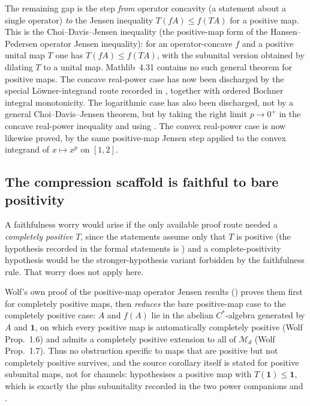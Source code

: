 \documentclass{article}
\begin{document}
The remaining gap is the step \emph{from} operator concavity (a statement about a
single operator) \emph{to} the Jensen inequality $T(fA)\le f(TA)$ for a positive
map.  This is the Choi--Davis--Jensen inequality (the positive-map form of the
Hansen--Pedersen operator Jensen inequality): for an operator-concave $f$ and a
positive unital map $T$ one has $T(fA)\le f(TA)$, with the subunital version
obtained by dilating $T$ to a unital map.  Mathlib~4.31 contains no such
general theorem for positive maps.  The concave real-power case has now been
discharged by the special Löwner-integrand route recorded in
, together
with ordered Bochner integral monotonicity.  The logarithmic case has also been
discharged, not by a general Choi--Davis--Jensen theorem, but by taking the
right limit $p\to 0^+$ in the concave real-power inequality and using
.  The convex real-power case is now
likewise proved, by the same positive-map Jensen step applied to the convex
integrand of $x\mapsto x^p$ on $[1,2]$.

\subsection{The compression scaffold is faithful to bare
positivity}\label{ssec:caveat}

A faithfulness worry would arise if the only available proof route needed a
\emph{completely positive} $T$, since the statements assume only that $T$ is
positive (the hypothesis recorded in the formal statements is
) and a complete-positivity hypothesis would be the
stronger-hypothesis variant forbidden by the faithfulness rule.  That worry does
not apply here.

Wolf's own proof of the positive-map operator Jensen results
(\cite[Theorems~5.10--5.13]{Wolf2012Quantum}) proves them first for completely
positive maps, then \emph{reduces} the bare positive-map case to the completely
positive case: $A$ and $f(A)$ lie in the abelian $C^*$-algebra generated by $A$
and $\mathbf 1$, on which every positive map is automatically completely
positive (Wolf Prop.~1.6) and admits a completely positive extension to all of
$\mathcal M_d$ (Wolf Prop.~1.7).  Thus no obstruction specific to maps that are
positive but not completely positive survives, and the source corollary itself
is stated for
positive subunital maps, not for channels: \cite[Corollary~5.2]{Wolf2012Quantum}
hypothesises a positive map with $T(\mathbf 1)\le\mathbf 1$, which is exactly the
 plus subunitality recorded in the two power companions
 and
.
\end{document}
